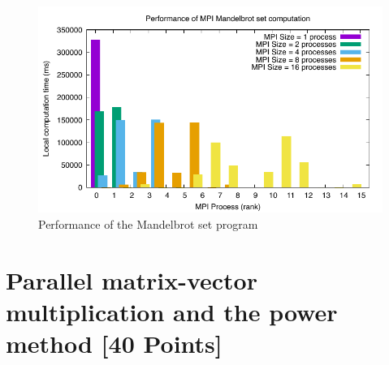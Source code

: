 \documentclass[unicode,11pt,a4paper,oneside,numbers=endperiod,openany]{scrartcl}
\begin{document}
\begin{figure}
      \centering
      \includegraphics[width=.8\linewidth]{plots/mandel_perf.pdf}
      \caption{Performance of the Mandelbrot set program}
      \label{fig:mandelbrot_perf}
\end{figure}


\section{Parallel matrix-vector multiplication and the power method
        [40 Points]}
\end{document}
